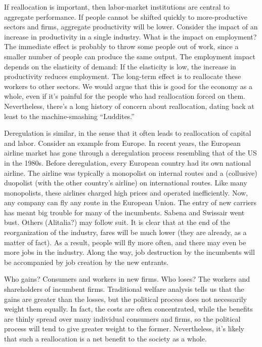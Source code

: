 If reallocation is important,
then labor-market institutions are central to aggregate performance.
If people cannot be shifted quickly to more-productive sectors
and firms, aggregate productivity will be lower.
Consider the impact of an increase in productivity in a single industry.
What is the impact on employment?
The immediate effect is probably to throw some people out of work, since
a smaller number of people can produce the same output.
The employment impact depends on the elasticity of demand:  If the elasticity is low,
the increase in productivity reduces employment.
The long-term effect is to reallocate these workers
to other sectors.
We would argue that this is good for the economy as a whole,
even if it's painful for the people who had reallocation forced on them.
Nevertheless, there's a long history of concern about reallocation,
dating back at least to the machine-smashing ``Luddites.''


Deregulation is similar, in the sense that it often leads to reallocation of capital and labor.  Consider an example from Europe. In recent years, the European
airline market has gone through a deregulation process resembling that of the US in the 1980s. Before
deregulation, every European country had its own national airline.
The airline was typically a monopolist on internal routes and a
(collusive) duopolist (with the other country's airline) on
international routes.  Like many monopolists, these airlines
charged high prices and operated inefficiently.  Now, any company
can fly any route in the European Union. The entry of new carriers
has meant big trouble
for many of the incumbents. Sabena and Swissair went bust. Others
(Alitalia?) may follow suit. It is clear that at the end
of the reorganization of the industry, fares will be much lower
(they are already, as a matter of fact).
As a result, people will fly more often,
 and there may even be more jobs in the industry.
 Along the way, job destruction by the incumbents will be
 accompanied by job creation by the new entrants.


Who gains? Consumers and workers in new firms. Who loses?
The workers and shareholders of incumbent firms.
Traditional welfare analysis tells us
that the gains are greater than the losses,
but the political process does not necessarily weight them
equally.  In fact, the costs are often concentrated, while the benefits are thinly spread over many individual consumers and firms,
so the political process will tend to give greater weight to the former.
Nevertheless, it's likely that such a reallocation
is a net benefit to the society as a whole.

